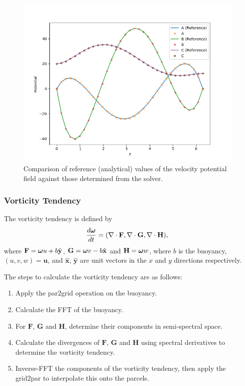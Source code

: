 \documentclass{article}
\renewcommand{\v}[1]{\ensuremath{\mathbf{#1}}} %
\newcommand{\gv}[1]{\ensuremath{\mbox{\boldmath$ #1 $}}}
\newcommand{\uv}[1]{\hat{\ensuremath{\mathbf{ #1 }}}} %
\renewcommand{\d}[2]{\frac{d #1}{d #2}} %
\renewcommand{\div}[1]{\v{\nabla} \cdot #1} %
\begin{document}
\begin{figure}
  \begin{center}
    \includegraphics[scale=0.6]{pmpic_images/solution.png}
  \end{center}
  \caption{Comparison of reference (analytical) values of the velocity potential field against those determined from the solver.}
  \label{inversion_fig}
\end{figure}


\subsubsection{Vorticity Tendency}\label{tendency}
The vorticity tendency is defined by
\begin{equation}
  \d{\gv{\omega}}{t} = ( \div{\v{F}},\div{\v{G}},\div{\v{H}}),
\end{equation}
where $\v{F} = \gv{\omega}u + b \uv{y} $, $\v{G}=\gv{\omega}v - b \uv{x}$ and $\v{H}=\gv{\omega}w$, where $b$ is the buoyancy, $(u,v,w) = \v{u}$, and $\uv{x}$, $\uv{y}$ are unit vectors in the $x$ and $y$ directions respectively.

The steps to calculate the vorticity tendency are as follows:
\begin{enumerate}
  \item Apply the par2grid operation on the buoyancy.
  \item Calculate the FFT of the buoyancy.
  \item For $\v{F}$, $\v{G}$ and $\v{H}$, determine their components in semi-spectral space.
  \item  Calculate the divergences of $\v{F}$, $\v{G}$ and $\v{H}$ using spectral derivatives to determine the vorticity tendency.
  \item Inverse-FFT the components of the vorticity tendency, then apply the grid2par to interpolate this onto the parcels.
\end{enumerate}
\end{document}

